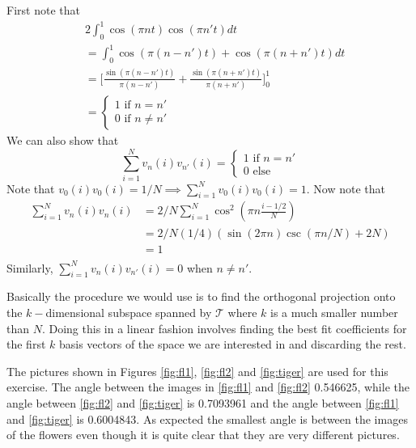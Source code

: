 \documentclass[12pt, leqno]{article}
\begin{document}
First note that  
\begin{align*}
&2\int_0^1\cos(\pi n t) \cos(\pi n' t) dt \\
& = \int_0^1 \cos(\pi (n-n') t) + \cos(\pi (n+n') t) dt \\
& = \big[ \frac{\sin(\pi (n-n') t)}{\pi (n-n')} + \frac{\sin(\pi (n+n') t)}{\pi (n+n')} \big]_0^1\\
&= \begin{cases}
1 \text{ if } n=n' \\
0 \text{ if } n\neq n'
\end{cases}
\end{align*}
We can also show that 
$$
\sum_{i = 1}^{N} v_{n}(i)v_{n'}(i) = \begin{cases} 1 \text{ if } n = n' \\
0 \text{ else } \end{cases}
$$ 
Note that $v_0(i)v_0(i) = 1/N \implies \sum_{i = 1}^{N} v_0(i)v_0(i) = 1$. Now note that 
\begin{align*}
\sum_{i = 1}^N v_n(i)v_n(i) &= 2/N \sum_{i = 1}^N \cos^2(\pi n \frac{i-1/2}{N}) \\
&= 2/N (1/4) (\sin(2 \pi n) \csc(\pi n / N) + 2N) \\
&= 1 \\
\end{align*}
Similarly, $\sum_{i = 1}^N v_n(i)v_{n'}(i) = 0$ when $n \neq n'$.

Basically the procedure we would use is to find the orthogonal projection onto the $k-$dimensional subspace spanned by $\mathcal{T}$ where $k$ is a much smaller number than $N$. Doing this in a linear fashion involves finding the best fit coefficients for the first $k$ basis vectors of the space we are interested in and discarding the rest. 

The pictures shown in Figures \ref{fig:fl1},  \ref{fig:fl2} and \ref{fig:tiger} are used for this exercise. The angle between the images in \ref{fig:fl1} and \ref{fig:fl2} 0.546625, while the angle between  \ref{fig:fl2} and \ref{fig:tiger} is 0.7093961 and the angle between \ref{fig:fl1} and \ref{fig:tiger} is 0.6004843. As expected the smallest angle is between the images of the flowers even though it is quite clear that they are very different pictures. 
\end{document}
